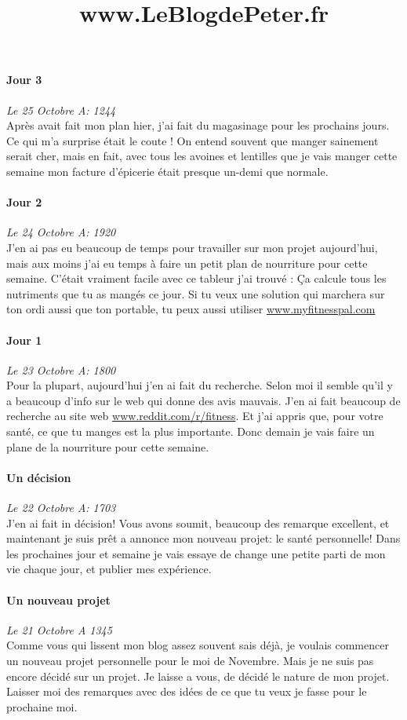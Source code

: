 \documentclass{article}
\begin{document}
\title{www.LeBlogdePeter.fr}


\paragraph{Jour 3} \emph{Le 25 Octobre A: 1244}\\
Après avait fait mon plan hier, j'ai fait du magasinage pour les prochains jours. Ce qui m'a surprise était le coute ! On entend souvent que manger sainement serait cher, mais en fait, avec tous les avoines et lentilles que je vais manger cette semaine mon facture d'épicerie était presque un-demi que normale.

\paragraph{Jour 2} \emph{Le 24 Octobre A: 1920}\\
J'en ai pas eu beaucoup de temps pour travailler sur mon projet aujourd'hui, mais aux moins j'ai eu temps à faire un petit plan de nourriture
pour cette semaine. C'était vraiment facile avec ce tableur j'ai trouvé : Ça calcule tous les nutriments que tu as mangés ce jour. Si tu veux une solution qui marchera sur ton ordi aussi que ton portable, tu peux aussi utiliser \underline{www.myfitnesspal.com}

\paragraph{Jour 1} \emph{Le 23 Octobre A: 1800}\\
Pour la plupart, aujourd'hui j'en ai fait du recherche. Selon moi il semble qu'il y a beaucoup d'info sur le web qui donne des avis mauvais. J'en ai fait beaucoup de recherche au site web \underline{www.reddit.com/r/fitness}. Et j'ai appris que, pour votre santé, ce que tu manges est la plus importante. Donc demain je vais faire un plane de la nourriture pour cette semaine.
\paragraph{Un décision} \emph{Le 22 Octobre A: 1703}\\
J'en ai fait in décision!  Vous avons soumit, beaucoup des remarque excellent, et maintenant je suis prêt a annonce mon nouveau projet: le santé personnelle! Dans les prochaines jour et semaine je vais essaye de change une petite parti de mon vie chaque jour, et publier mes expérience.

\paragraph{Un nouveau projet} \emph{Le 21 Octobre A 1345} \\
Comme vous qui lissent mon blog assez souvent sais déjà, je voulais commencer un nouveau projet personnelle pour le moi de Novembre. Mais je ne suis pas encore décidé sur un projet. Je laisse a vous, de décidé le nature de mon projet. Laisser moi des remarques avec des idées de ce que tu veux je fasse pour le prochaine moi.
\end{document}
